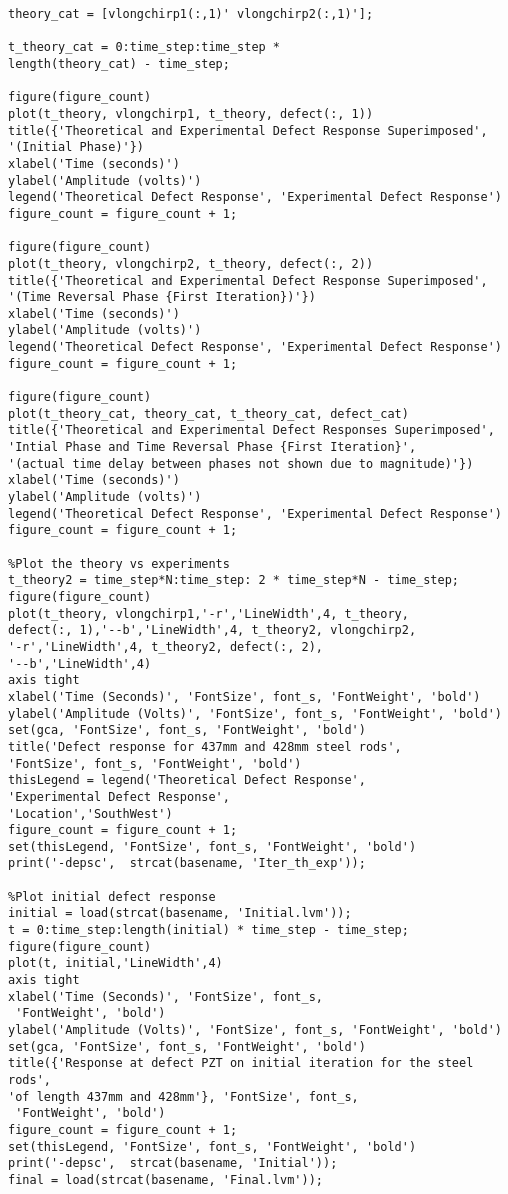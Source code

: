\begin{lstlisting}
theory_cat = [vlongchirp1(:,1)' vlongchirp2(:,1)'];

t_theory_cat = 0:time_step:time_step * 
length(theory_cat) - time_step;

figure(figure_count)
plot(t_theory, vlongchirp1, t_theory, defect(:, 1))
title({'Theoretical and Experimental Defect Response Superimposed', 
'(Initial Phase)'})
xlabel('Time (seconds)')
ylabel('Amplitude (volts)')
legend('Theoretical Defect Response', 'Experimental Defect Response')
figure_count = figure_count + 1;

figure(figure_count)
plot(t_theory, vlongchirp2, t_theory, defect(:, 2))
title({'Theoretical and Experimental Defect Response Superimposed', 
'(Time Reversal Phase {First Iteration})'})
xlabel('Time (seconds)')
ylabel('Amplitude (volts)')
legend('Theoretical Defect Response', 'Experimental Defect Response')
figure_count = figure_count + 1;

figure(figure_count)
plot(t_theory_cat, theory_cat, t_theory_cat, defect_cat)
title({'Theoretical and Experimental Defect Responses Superimposed', 
'Intial Phase and Time Reversal Phase {First Iteration}', 
'(actual time delay between phases not shown due to magnitude)'})
xlabel('Time (seconds)')
ylabel('Amplitude (volts)')
legend('Theoretical Defect Response', 'Experimental Defect Response')
figure_count = figure_count + 1;

%Plot the theory vs experiments
t_theory2 = time_step*N:time_step: 2 * time_step*N - time_step;
figure(figure_count)
plot(t_theory, vlongchirp1,'-r','LineWidth',4, t_theory,
defect(:, 1),'--b','LineWidth',4, t_theory2, vlongchirp2,
'-r','LineWidth',4, t_theory2, defect(:, 2),
'--b','LineWidth',4)
axis tight
xlabel('Time (Seconds)', 'FontSize', font_s, 'FontWeight', 'bold')
ylabel('Amplitude (Volts)', 'FontSize', font_s, 'FontWeight', 'bold')
set(gca, 'FontSize', font_s, 'FontWeight', 'bold')
title('Defect response for 437mm and 428mm steel rods', 
'FontSize', font_s, 'FontWeight', 'bold')
thisLegend = legend('Theoretical Defect Response', 
'Experimental Defect Response',
'Location','SouthWest')
figure_count = figure_count + 1;
set(thisLegend, 'FontSize', font_s, 'FontWeight', 'bold')
print('-depsc',  strcat(basename, 'Iter_th_exp'));

%Plot initial defect response
initial = load(strcat(basename, 'Initial.lvm'));
t = 0:time_step:length(initial) * time_step - time_step;
figure(figure_count)
plot(t, initial,'LineWidth',4)
axis tight
xlabel('Time (Seconds)', 'FontSize', font_s,
 'FontWeight', 'bold')
ylabel('Amplitude (Volts)', 'FontSize', font_s, 'FontWeight', 'bold')
set(gca, 'FontSize', font_s, 'FontWeight', 'bold')
title({'Response at defect PZT on initial iteration for the steel rods', 
'of length 437mm and 428mm'}, 'FontSize', font_s,
 'FontWeight', 'bold')
figure_count = figure_count + 1;
set(thisLegend, 'FontSize', font_s, 'FontWeight', 'bold')
print('-depsc',  strcat(basename, 'Initial'));
final = load(strcat(basename, 'Final.lvm'));


\end{lstlisting}
